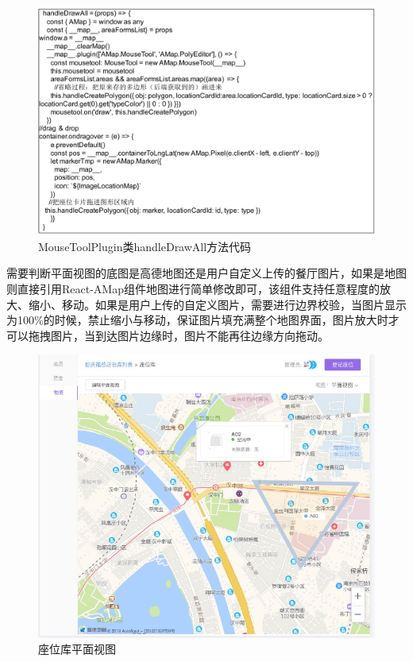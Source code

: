\begin{figure}[htbp!]
    \centering
    \includegraphics[width=5in]{FIGs/chapter4/13.pdf}
    \caption{MouseToolPlugin类handleDrawAll方法代码}\label{fig_seat_13}
\end{figure}

需要判断平面视图的底图是高德地图还是用户自定义上传的餐厅图片，如果是地图则直接引用React-AMap组件地图进行简单修改即可，该组件支持任意程度的放大、缩小、移动。如果是用户上传的自定义图片，需要进行边界校验，当图片显示为100\%的时候，禁止缩小与移动，保证图片填充满整个地图界面，图片放大时才可以拖拽图片，当到达图片边缘时，图片不能再往边缘方向拖动。

\begin{figure}[htbp!]
    \centering
    \includegraphics[width=5in]{FIGs/chapter4/seat_map.pdf}
    \caption{座位库平面视图}\label{fig_seat_map}
\end{figure}

